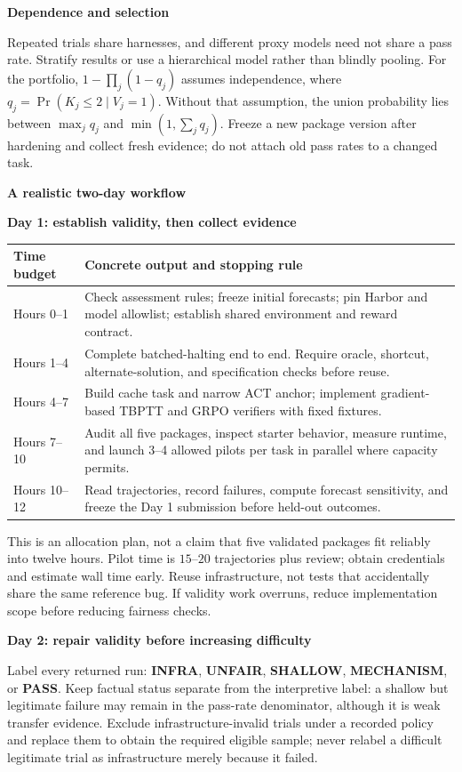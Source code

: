 \documentclass[11pt,a4paper]{article}
\newcommand{\sect}[2]{\vspace{3pt}{\small\color{accent}\textbf{#1}}\par{\LARGE\bfseries #2}\par\vspace{6pt}}
\newcommand{\sub}[1]{\vspace{4pt}\textbf{#1}\par}
\begin{document}
\sub{Dependence and selection}
Repeated trials share harnesses, and different proxy models need not share a pass rate. Stratify results or use a hierarchical model rather than blindly pooling. For the portfolio, $1-\prod_j(1-q_j)$ assumes independence, where $q_j=\Pr(K_j\leq2\mid V_j=1)$. Without that assumption, the union probability lies between $\max_jq_j$ and $\min(1,\sum_jq_j)$. Freeze a new package version after hardening and collect fresh evidence; do not attach old pass rates to a changed task.

\newpage
\sect{06 / EXECUTION}{A realistic two-day workflow}

\sub{Day 1: establish validity, then collect evidence}
\begin{tabularx}{\linewidth}{@{}lX@{}}
\toprule
Time budget & Concrete output and stopping rule\\
\midrule
Hours 0--1 & Check assessment rules; freeze initial forecasts; pin Harbor and model allowlist; establish shared environment and reward contract.\\
Hours 1--4 & Complete batched-halting end to end. Require oracle, shortcut, alternate-solution, and specification checks before reuse.\\
Hours 4--7 & Build cache task and narrow ACT anchor; implement gradient-based TBPTT and GRPO verifiers with fixed fixtures.\\
Hours 7--10 & Audit all five packages, inspect starter behavior, measure runtime, and launch 3--4 allowed pilots per task in parallel where capacity permits.\\
Hours 10--12 & Read trajectories, record failures, compute forecast sensitivity, and freeze the Day 1 submission before held-out outcomes.\\
\bottomrule
\end{tabularx}

This is an allocation plan, not a claim that five validated packages fit reliably into twelve hours. Pilot time is $15$--$20$ trajectories plus review; obtain credentials and estimate wall time early. Reuse infrastructure, not tests that accidentally share the same reference bug. If validity work overruns, reduce implementation scope before reducing fairness checks.

\sub{Day 2: repair validity before increasing difficulty}
Label every returned run: \textbf{INFRA}, \textbf{UNFAIR}, \textbf{SHALLOW}, \textbf{MECHANISM}, or \textbf{PASS}. Keep factual status separate from the interpretive label: a shallow but legitimate failure may remain in the pass-rate denominator, although it is weak transfer evidence. Exclude infrastructure-invalid trials under a recorded policy and replace them to obtain the required eligible sample; never relabel a difficult legitimate trial as infrastructure merely because it failed.
\end{document}
